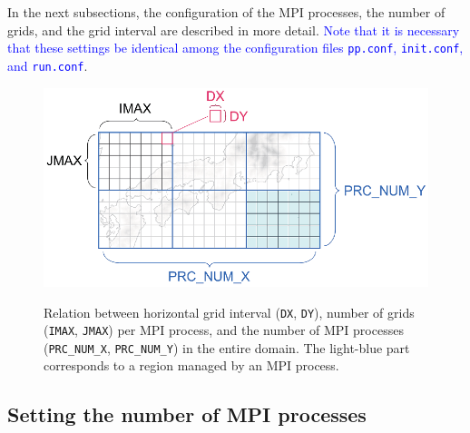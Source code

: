In the next subsections, the configuration of the MPI processes, the number of grids, and the grid interval are described in more detail.  \textcolor{blue}{Note that it is necessary that these settings  be identical among the configuration files \texttt{pp.conf},  \texttt{init.conf}, and \texttt{run.conf}}.

\begin{figure}[h]
\begin{center}
  \includegraphics[width=0.8\hsize]{./figure/domain_decomposition.eps}\\
  \caption{Relation between horizontal grid interval (\texttt{DX}, \texttt{DY}), number of grids (\texttt{IMAX}, \texttt{JMAX}) 
    per MPI process, and the number of MPI processes (\texttt{PRC\_NUM\_X}, \texttt{PRC\_NUM\_Y})     in the entire domain. The light-blue part corresponds to a region managed by an MPI process.}
  \label{fig:domain}
\end{center}
\end{figure}



\subsection{Setting the number of MPI processes} \label{subsec:relation_dom_reso2}


